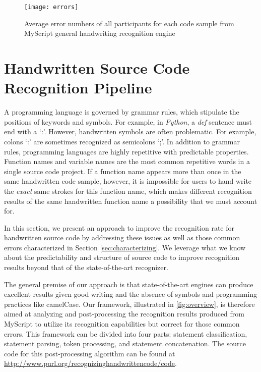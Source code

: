 \documentclass{vgtc}                          %
\begin{document}
\begin{figure}[t!]
\centering
\texttt{[image: errors]}
\caption{Average error numbers of all participants for each code sample from MyScript general handwriting recognition engine}
\label{fig:errors}
\end{figure}


\section{Handwritten Source Code Recognition Pipeline}



A programming language is governed by grammar rules, which stipulate the positions of keywords and symbols. For example, in \textit{Python}, a \textit{def} sentence must end with a `:'. However, handwritten symbols are often problematic.  For example, colons `:' are sometimes recognized as semicolons `;'. In addition to grammar rules, programming languages are highly repetitive with predictable properties\cite{hindle2012naturalness}. 
Function names and variable names are the most common repetitive words in a single source code project. If a function name appears more than once in the same handwritten code sample, however, it is impossible for users to hand write the \textit{exact} same strokes for this function name, which makes different recognition results of the same handwritten function name a possibility that we must account for.

In this section, we present an approach to improve the recognition rate for handwritten source code by addressing these issues as well as those common errors characterized in Section \ref{sec:characterizing}. We leverage what we know about the predictability and structure of source code to improve recognition results beyond that of the state-of-the-art recognizer. 


The general premise of our approach is that state-of-the-art engines can produce excellent results given good writing and the absence of symbols and programming practices like camelCase.  Our framework, illustrated in \autoref{fig:overview}, is therefore aimed at analyzing and post-processing the recognition results produced from MyScript to utilize its recognition capabilities but correct for those common errors. This framework can be divided into four parts: statement classification, statement parsing, token processing, and statement concatenation. 
The source code for this post-processing algorithm can be found at \url{http://www.purl.org/recognizinghandwrittencode/code}.
\end{document}
